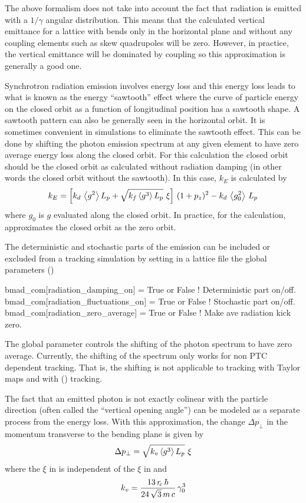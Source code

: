 The above formalism does not take into account the fact that radiation is emitted with a $1/\gamma$
angular distribution. This means that the calculated vertical emittance for a lattice with bends
only in the horizontal plane and without any coupling elements such as skew quadrupoles will be
zero. However, in practice, the vertical emittance will be dominated by coupling so this
approximation is generally a good one.

Synchrotron radiation emission involves energy loss and this energy loss leads to what is known as
the energy ``sawtooth'' effect where the curve of particle energy on the closed orbit as a function
of longitudinal position has a sawtooth shape. A sawtooth pattern can also be generally seen in the
horizontal orbit. It is sometimes convenient in simulations to eliminate the sawtooth effect. This
can be done by shifting the photon emission spectrum at any given element to have zero average
energy loss along the closed orbit. For this calculation the closed orbit should be the closed orbit
as calculated without radiation damping (in other words the closed orbit without the sawtooth). In
this case, $k_E$ is calculated by
\begin{equation}
  k_E = \left[ k_d \, \left\langle g^2 \right\rangle L_p + \sqrt{k_f \left\langle g^3 \right\rangle L_p} \,\, \xi \right] \, (1 + p_z)^2 - 
  k_d \, \left\langle g_0^2 \right\rangle \, L_p
\end{equation}
where $g_0$ is $g$ evaluated along the closed orbit. In practice, for the calculation, \bmad
approximates the closed orbit as the zero orbit. 

The deterministic and stochastic parts of the emission can be included or excluded from a tracking
simulation by setting in a lattice file the \bmad global parameters ()
\begin{example}
  bmad_com[radiation_damping_on]      = True or False  ! Deterministic part on/off.
  bmad_com[radiation_fluctuations_on] = True or False  ! Stochastic part on/off.
  bmad_com[radiation_zero_average]    = True or False  ! Make ave radiation kick zero.
\end{example}
The global parameter  controls the shifting of the photon
spectrum to have zero average. Currently, the shifting of the spectrum only works for non PTC
dependent tracking. That is, the shifting is not applicable to tracking with Taylor maps and with
 () tracking.

The fact that an emitted photon is not exactly colinear with the particle direction (often called
the ``vertical opening angle'') can be modeled as a separate process from the energy loss. With this
approximation, the change $\Delta p_\perp$ in the momentum transverse to the bending plane is given
by
\begin{equation}
  \Delta p_\perp = \sqrt{k_v \left\langle g^3 \right\rangle L_p} \,\, \xi
  \label{dpkgl}
\end{equation}
where the $\xi$ in  is independent of the $\xi$ in  and
\begin{equation}
 k_v = \frac{13 \, r_{\!c} \, \hbar}{24 \, \sqrt{3} \, m \, c} \, \gamma_0^3
\end{equation}

